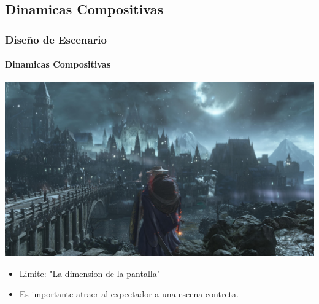 \documentclass[11pt]{beamer}
\begin{document}
\subsection{Dinamicas Compositivas}
\begin{frame}

\frametitle{Diseño de Escenario}
\framesubtitle{Dinamicas Compositivas}
\begin{center}


 \includegraphics[scale=0.08,keepaspectratio=true]{img/ima1.jpg}
\end{center}
	\begin{itemize}
	\item Limite: "La dimension de la pantalla"
	\item Es importante  atraer al expectador a una escena contreta.
	\end{itemize}
\end{frame}
\end{document}

